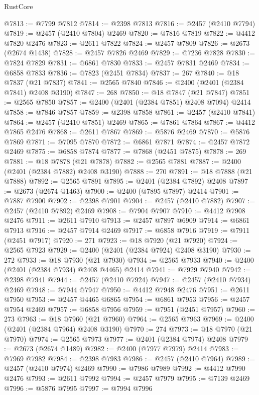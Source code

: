 \begin{lexlean}{RustCore}
\begin{coremodule}
@7813 := @7799 @7812
@7814 := @2398 @7813
@7816 := @2457 (@2410 @7794)
@7819 := @2457 (@2410 @7804) @2469
@7820 := @7816 @7819
@7822 := @4412 @7820 @2476
@7823 := @2611 @7822
@7824 := @2457 @7809
@7826 := @2673 (@2674 @1438)
@7828 := @2457 @7826 @2469
@7829 := @7236 @7828
@7830 := @7824 @7829
@7831 := @6861 @7830
@7833 := @2457 @7831 @2469
@7834 := @6858 @7833
@7836 := @7823 (@2451 @7834)
@7837 := 267
@7840 := @18 @7837 (@21 @7837)
@7841 := @2565 @7840
@7846 := @2400 (@2401 (@2384 @7841) @2408 @3190)
@7847 := 268
@7850 := @18 @7847 (@21 @7847)
@7851 := @2565 @7850
@7857 := @2400 (@2401 (@2384 @7851) @2408 @7094) @2414
@7858 := @7846 @7857
@7859 := @2398 @7858
@7861 := @2457 (@2410 @7841)
@7864 := @2457 (@2410 @7851) @2469
@7865 := @7861 @7864
@7867 := @4412 @7865 @2476
@7868 := @2611 @7867
@7869 := @5876 @2469
@7870 := @5876 @7869
@7871 := @7095 @7870
@7872 := @6861 @7871
@7874 := @2457 @7872 @2469
@7875 := @6858 @7874
@7877 := @7868 (@2451 @7875)
@7878 := 269
@7881 := @18 @7878 (@21 @7878)
@7882 := @2565 @7881
@7887 := @2400 (@2401 (@2384 @7882) @2408 @3190)
@7888 := 270
@7891 := @18 @7888 (@21 @7888)
@7892 := @2565 @7891
@7895 := @2401 (@2384 @7892) @2408
@7897 := @2673 (@2674 @1463)
@7900 := @2400 (@7895 @7897) @2414
@7901 := @7887 @7900
@7902 := @2398 @7901
@7904 := @2457 (@2410 @7882)
@7907 := @2457 (@2410 @7892) @2469
@7908 := @7904 @7907
@7910 := @4412 @7908 @2476
@7911 := @2611 @7910
@7913 := @2457 @7897 @6909
@7914 := @6861 @7913
@7916 := @2457 @7914 @2469
@7917 := @6858 @7916
@7919 := @7911 (@2451 @7917)
@7920 := 271
@7923 := @18 @7920 (@21 @7920)
@7924 := @2565 @7923
@7929 := @2400 (@2401 (@2384 @7924) @2408 @3190)
@7930 := 272
@7933 := @18 @7930 (@21 @7930)
@7934 := @2565 @7933
@7940 := @2400 (@2401 (@2384 @7934) @2408 @4465) @2414
@7941 := @7929 @7940
@7942 := @2398 @7941
@7944 := @2457 (@2410 @7924)
@7947 := @2457 (@2410 @7934) @2469
@7948 := @7944 @7947
@7950 := @4412 @7948 @2476
@7951 := @2611 @7950
@7953 := @2457 @4465 @6865
@7954 := @6861 @7953
@7956 := @2457 @7954 @2469
@7957 := @6858 @7956
@7959 := @7951 (@2451 @7957)
@7960 := 273
@7963 := @18 @7960 (@21 @7960)
@7964 := @2565 @7963
@7969 := @2400 (@2401 (@2384 @7964) @2408 @3190)
@7970 := 274
@7973 := @18 @7970 (@21 @7970)
@7974 := @2565 @7973
@7977 := @2401 (@2384 @7974) @2408
@7979 := @2673 (@2674 @1489)
@7982 := @2400 (@7977 @7979) @2414
@7983 := @7969 @7982
@7984 := @2398 @7983
@7986 := @2457 (@2410 @7964)
@7989 := @2457 (@2410 @7974) @2469
@7990 := @7986 @7989
@7992 := @4412 @7990 @2476
@7993 := @2611 @7992
@7994 := @2457 @7979
@7995 := @7139 @2469
@7996 := @5876 @7995
@7997 := @7994 @7996

\end{coremodule}
\end{lexlean}
